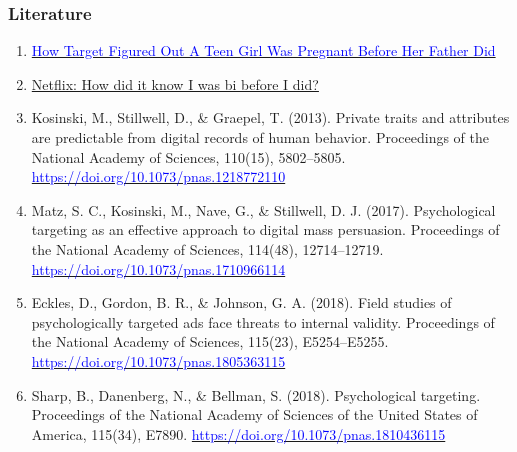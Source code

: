 \documentclass{beamer}
\begin{document}
\begin{frame}
    \frametitle{Literature}
    \scriptsize
    \begin{enumerate}
        \item \href{https://www.forbes.com/sites/kashmirhill/2012/02/16/how-target-figured-out-a-teen-girl-was-pregnant-before-her-father-did/?sh=1333c4646668}{\textcolor{blue}{How Target Figured Out A Teen Girl Was Pregnant Before Her Father Did}}
        \item \href{https://www.bbc.com/news/technology-66472938}{Netflix: How did it know I was bi before I did?}
        \item Kosinski, M., Stillwell, D., \& Graepel, T. (2013). Private traits and attributes are predictable from digital records of human behavior. Proceedings of the National Academy of Sciences, 110(15), 5802–5805. \href{https://doi.org/10.1073/pnas.1218772110}{\textcolor{blue}{https://doi.org/10.1073/pnas.1218772110}}
        \item Matz, S. C., Kosinski, M., Nave, G., \& Stillwell, D. J. (2017). Psychological targeting as an effective approach to digital mass persuasion. Proceedings of the National Academy of Sciences, 114(48), 12714–12719. \href{https://doi.org/10.1073/pnas.1710966114}{\textcolor{blue}{https://doi.org/10.1073/pnas.1710966114}}
        \item Eckles, D., Gordon, B. R., \& Johnson, G. A. (2018). Field studies of psychologically targeted ads face threats to internal validity. Proceedings of the National Academy of Sciences, 115(23), E5254–E5255. \href{https://doi.org/10.1073/pnas.1805363115}{\textcolor{blue}{https://doi.org/10.1073/pnas.1805363115}}
        \item Sharp, B., Danenberg, N., \& Bellman, S. (2018). Psychological targeting. Proceedings of the National Academy of Sciences of the United States of America, 115(34), E7890. \href{https://doi.org/10.1073/pnas.1810436115}{\textcolor{blue}{https://doi.org/10.1073/pnas.1810436115}}
    \end{enumerate}
\end{frame}
\end{document}
